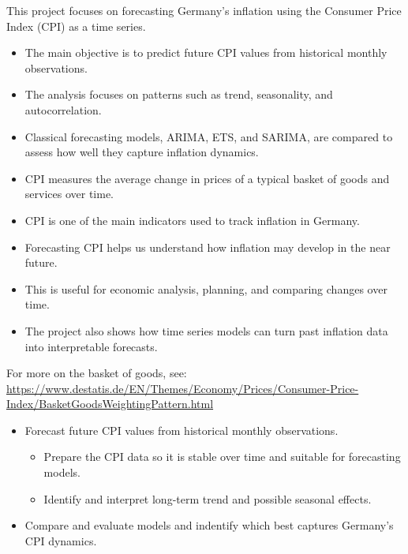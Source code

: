 
{
    This project focuses on forecasting Germany's inflation using the Consumer Price Index (CPI) as a time series.

    \vspace{0.2cm}
    \begin{itemize}
        \item The main objective is to predict future CPI values from historical monthly observations.
        \item The analysis focuses on patterns such as trend, seasonality, and autocorrelation.
        \item Classical forecasting models, ARIMA, ETS, and SARIMA, are compared to assess how well they capture inflation dynamics.
    \end{itemize}
}



{
    \begin{itemize}
        \item CPI measures the average change in prices of a typical basket of goods and services over time.
        \item CPI is one of the main indicators used to track inflation in Germany.
        \item Forecasting CPI helps us understand how inflation may develop in the near future.
        \item This is useful for economic analysis, planning, and comparing changes over time.
        \item The project also shows how time series models can turn past inflation data into interpretable forecasts.
    \end{itemize}

    {\scriptsize For more on the basket of goods, see: \url{https://www.destatis.de/EN/Themes/Economy/Prices/Consumer-Price-Index/BasketGoodsWeightingPattern.html}}
}

{
    \begin{itemize}
        \item Forecast future CPI values from historical monthly observations.
        \begin{itemize}
            \item Prepare the CPI data so it is stable over time and suitable for forecasting models.
            \item Identify and interpret long-term trend and possible seasonal effects.
        \end{itemize}
        \item Compare and evaluate models and indentify which best captures Germany's CPI dynamics.
    \end{itemize}

}

